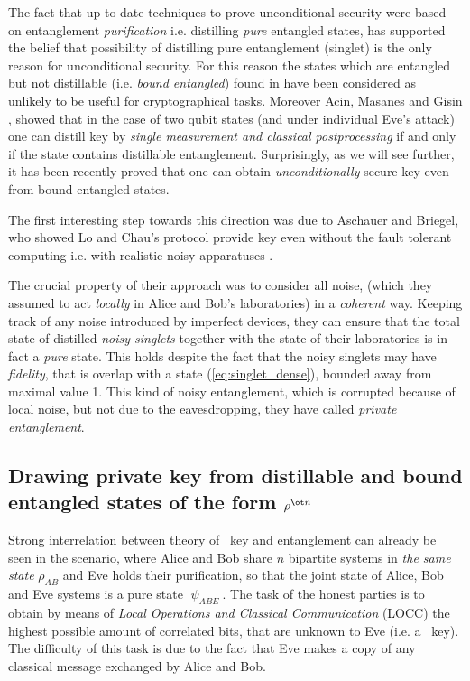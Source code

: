\documentclass[twocolumn,aps,rmp]{revtex4}
\begin{document}
The fact that up to date techniques to prove unconditional security
were based on entanglement {\it purification} i.e.  distilling {\it
pure} entangled states, has supported the belief that possibility of
distilling pure entanglement (singlet) is the only reason for unconditional
security.  For this reason the states which are entangled but not
distillable (i.e. {\it bound entangled}) found in \cite{bound} have
been considered as unlikely to be useful for cryptographical tasks. Moreover
Acin, Masanes and Gisin \cite{ALG_2_equiv}, showed that in the case of
two qubit states (and under individual Eve's attack) one can distill
key by {\it single measurement and classical postprocessing} if and
only if the state contains distillable entanglement. Surprisingly, as
we will see further, it has been recently proved that one can obtain
{\it unconditionally} secure key even from bound entangled states.

The first interesting step towards this direction was due to Aschauer and Briegel,
who showed Lo and Chau's protocol provide key even without the fault tolerant
computing i.e. with realistic noisy apparatuses \cite{AschauerBriegel2002}.

 The crucial property of their approach was
to consider all noise, (which they assumed to act {\it locally} in
Alice and Bob's laboratories) in a {\it coherent} way. Keeping track
of any noise introduced by imperfect devices, they can ensure that the
total state of distilled {\it noisy singlets} together with the state
of their laboratories is in fact a {\it pure} state. This holds
despite the fact that the noisy singlets may have {\it fidelity}, that
is overlap with a state (\ref{eq:singlet_dense}), bounded away from
maximal value 1. This kind of noisy entanglement, which is corrupted
because of local noise, but not due to the eavesdropping, they have
called {\it private entanglement}.





\subsection{Drawing private key from distillable and bound entangled
states of the form $\rho^{\ot n}$ }
\label{subsec:QKA}

Strong interrelation between theory of \secure\ key and entanglement
can already be seen in the scenario, where Alice and Bob share $n$
bipartite systems in {\it the same state} $\rho_{AB}$ and Eve holds
their purification, so that the joint state of Alice, Bob and Eve
systems is a pure state $|\psi_{ABE}\>$. The task of the honest
parties is to obtain by means of {\it Local Operations and Classical
  Communication} (LOCC) the highest possible amount of correlated
bits, that are unknown to Eve (i.e. a \secure\ key). The difficulty of
this task is due to the fact that Eve makes a copy of any classical
message exchanged by Alice and Bob.
\end{document}
